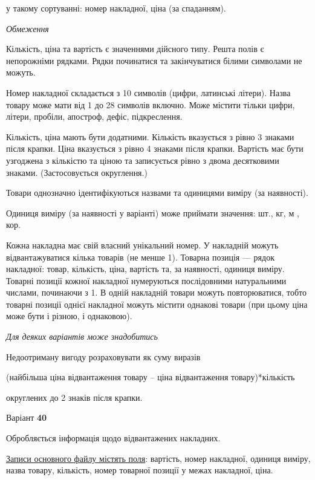 \documentclass[11pt, ukrainian]{article}
\begin{document}
{\noindent}у такому сортуванні: номер накладної, ціна (за спаданням).


\bigskip\textit{Обмеження}

Кількість, ціна та вартість є значеннями дійсного типу.
Решта полів є непорожніми рядками.
Рядки починатися та закінчуватися білими символами не можуть.

Номер накладної складається з 10 символів (цифри, латинські літери).
Назва товару може мати від 1 до 28 символів включно.
Може містити тільки цифри, літери, пробіли, апостроф, дефіс, підкреслення.

Кількість, ціна мають бути додатними.
Кількість вказується з рівно 3 знаками після крапки.
Ціна вказується з рівно 4 знаками після крапки.
Вартість має бути узгоджена з кількістю та ціною та записується рівно з двома десятковими знаками.
(Застосовується округлення.)

Товари однозначно ідентифікуються назвами та одиницями виміру (за наявності).

Одиниця виміру (за наявності у варіанті) може приймати значення: шт., кг, м , кор.

Кожна накладна має свій власний унікальний номер.
У накладній можуть відвантажуватися кілька товарів (не менше 1).
Товарна позиція --- рядок накладної: товар, кількість, ціна, вартість та, за наявності, одиниця виміру.
Товарні позиції кожної накладної нумеруються послідовними натуральними числами, починаючи з 1.
В одній накладній товари можуть повторюватися, 
тобто товарні позиції однієї накладної можуть містити однакові товари 
(при цьому ціна може бути і різною, і однаковою).

\bigskip\textit{Для деяких варіантів може знадобитись}

Недоотриману вигоду розраховувати як суму виразів
{\center (найбільша ціна відвантаження товару – ціна відвантаження товару)*кількість\par}

\bigskip
{\noindent} округлених до 2 знаків після крапки.




\par
\newpage
{\center Варіант  \No \textbf { 40 }\par}
\bigskip
Обробляється інформація щодо відвантажених накладних.

\underline{Записи основного файлу містять поля}: вартість, номер накладної, одиниця виміру, назва товару, кількість, номер товарної позиції у межах накладної, ціна.
\end{document}
